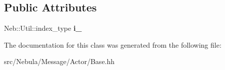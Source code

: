 \subsection*{\-Public \-Attributes}
\begin{DoxyCompactItemize}
\item 
\hypertarget{classNeb_1_1Message_1_1Actor_1_1Base_a14986969c3320dac0a1aea1933768fb6}{\-Neb\-::\-Util\-::index\-\_\-type {\bfseries i\-\_\-}}\label{classNeb_1_1Message_1_1Actor_1_1Base_a14986969c3320dac0a1aea1933768fb6}

\end{DoxyCompactItemize}


\-The documentation for this class was generated from the following file\-:\begin{DoxyCompactItemize}
\item 
src/\-Nebula/\-Message/\-Actor/\-Base.\-hh\end{DoxyCompactItemize}
